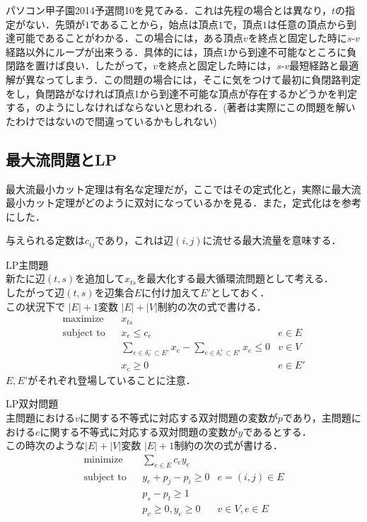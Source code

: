 \documentclass[13pt]{jarticle}
\theoremstyle{nonitalic} %
\begin{document}
パソコン甲子園2014予選問10を見てみる．これは先程の場合とは異なり，$t$の指定がない．先頭が$1$であることから，始点は頂点$1$で，頂点$1$は任意の頂点から到達可能であることがわかる．この場合には，ある頂点$v$を終点と固定した時に$s$-$v$経路以外にループが出来うる．具体的には，頂点$1$から到達不可能なところに負閉路を置けば良い．したがって，$v$を終点と固定した時には，$s$-$v$最短経路と最適解が異なってしまう．この問題の場合には，そこに気をつけて最初に負閉路判定をし，負閉路がなければ頂点1から到達不可能な頂点が存在するかどうかを判定する，のようにしなければならないと思われる．(著者は実際にこの問題を解いたわけではないので間違っているかもしれない)



\subsection{最大流問題とLP}
最大流最小カット定理は有名な定理だが，ここではその定式化と，実際に最大流最小カット定理がどのように双対になっているかを見る．また，定式化は\cite{kinji}を参考にした．

与えられる定数は$c_{ij}$であり，これは辺$(i,j)$に流せる最大流量を意味する．

LP主問題 \\
新たに辺$(t,s)$を追加して$x_{ts}$を最大化する最大循環流問題として考える． \\
したがって辺$(t,s)$を辺集合$E$に付け加えて$E'$としておく．\\
この状況下で $|E|+1$変数 $|E|+|V|$制約の次の式で書ける．
\begin{align}
 &&&&&\textrm{maximize}   && x_{ts}  \\
 &&&&&\textrm{subject to} && x_e\leq c_e & e \in E  &&&&&\\
 &&&&&                    && \sum_{e \in \delta_v^- \subset E'} x_e - \sum_{e \in \delta_v^+  \subset E'} x_e \leq 0 & v \in V &&&&& \\
 &&&&&                    && x_e \geq 0 & e \in E' &&&&&
\end{align}
$E, E'$がそれぞれ登場していることに注意．


LP双対問題 \\
主問題における$v$に関する不等式に対応する双対問題の変数が$p$であり，主問題における$e$に関する不等式に対応する双対問題の変数が$y$であるとする．\\
この時次のような$|E|+|V|$変数 $|E|+1$制約の次の式が書ける．
\begin{align}
 &&&&&\textrm{minimize}   && \sum_{e \in E} c_e y_e  \\
 &&&&&\textrm{subject to} && y_e + p_j - p_i \geq 0 &  e = (i, j) \in E  &&&&&\\
 &&&&&                    && p_s - p_t  \geq 1         &&&&& \\
 &&&&&                    && p_v \geq 0,  y_e \geq 0 &  v \in V, e \in E &&&&&
\end{align}
\end{document}
